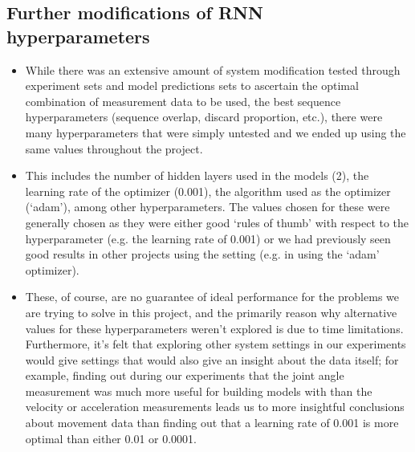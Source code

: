 \documentclass[12pt,twoside]{report}
\begin{document}
\subsection{Further modifications of RNN hyperparameters}
\begin{itemize}
	\item While there was an extensive amount of system modification tested through experiment sets and model predictions sets to ascertain the optimal combination of measurement data to be used, the best sequence hyperparameters (sequence overlap, discard proportion, etc.), there were many hyperparameters that were simply untested and we ended up using the same values throughout the project.
	\item This includes the number of hidden layers used in the models (2), the learning rate of the optimizer (0.001), the algorithm used as the optimizer (‘adam’), among other hyperparameters. The values chosen for these were generally chosen as they were either good ‘rules of thumb’ with respect to the hyperparameter (e.g. the learning rate of 0.001) or we had previously seen good results in other projects using the setting (e.g. in using the ‘adam’ optimizer).
	\item These, of course, are no guarantee of ideal performance for the problems we are trying to solve in this project, and the primarily reason why alternative values for these hyperparameters weren’t explored is due to time limitations. Furthermore, it’s felt that exploring other system settings in our experiments would give settings that would also give an insight about the data itself; for example, finding out during our experiments that the joint angle measurement was much more useful for building models with than the velocity or acceleration measurements leads us to more insightful conclusions about movement data than finding out that a learning rate of 0.001 is more optimal than either 0.01 or 0.0001.
\end{itemize}

\end{document}
